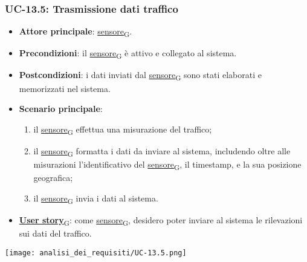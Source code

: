 \subsubsection{UC-13.5: Trasmissione dati traffico}
\begin{itemize}
	\item \textbf{Attore principale}: \href{https://7last.github.io/docs/rtb/documentazione-interna/glossario\#sensore}{sensore\textsubscript{G}}.
	\item \textbf{Precondizioni}: il \href{https://7last.github.io/docs/rtb/documentazione-interna/glossario\#sensore}{sensore\textsubscript{G}} è attivo e collegato al sistema.
	\item \textbf{Postcondizioni}: i dati inviati dal \href{https://7last.github.io/docs/rtb/documentazione-interna/glossario\#sensore}{sensore\textsubscript{G}} sono stati elaborati e memorizzati nel sistema.
	\item \textbf{Scenario principale}:
	      \begin{enumerate}
		      \item il \href{https://7last.github.io/docs/rtb/documentazione-interna/glossario\#sensore}{sensore\textsubscript{G}} effettua una misurazione del traffico;
		      \item il \href{https://7last.github.io/docs/rtb/documentazione-interna/glossario\#sensore}{sensore\textsubscript{G}} formatta i dati da inviare al sistema, includendo oltre alle misurazioni l'identificativo del \href{https://7last.github.io/docs/rtb/documentazione-interna/glossario\#sensore}{sensore\textsubscript{G}},
		            il timestamp, e la sua posizione geografica;
		      \item il \href{https://7last.github.io/docs/rtb/documentazione-interna/glossario\#sensore}{sensore\textsubscript{G}} invia i dati al sistema.
	      \end{enumerate}
	\item \href{https://7last.github.io/docs/rtb/documentazione-interna/glossario\#user-story}{\textbf{User story}\textsubscript{G}}: come \href{https://7last.github.io/docs/rtb/documentazione-interna/glossario\#sensore}{sensore\textsubscript{G}}, desidero poter inviare al sistema le rilevazioni sui dati del traffico.
\end{itemize}

\begin{center}
	\texttt{[image: analisi\_dei\_requisiti/UC-13.5.png]}
\end{center}

